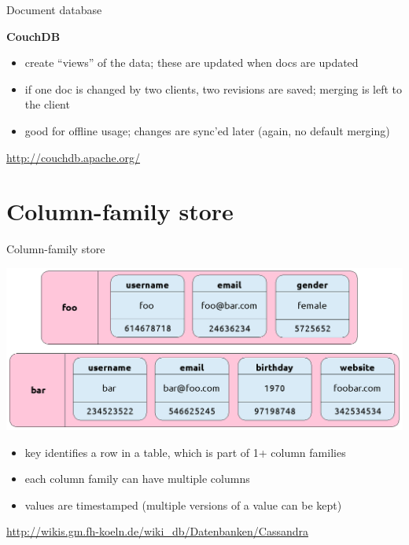 \documentclass{beamer}
\begin{document}
\begin{frame}{Document database}

  \textbf{CouchDB}

  \vskip 0.15in

  \begin{itemize}
  \item create ``views'' of the data; these are updated when docs are updated
  \item if one doc is changed by two clients, two revisions are saved;
    merging is left to the client
  \item good for offline usage; changes are sync'ed later (again, no
    default merging)
  \end{itemize}

  \vskip 0.15in

  \url{http://couchdb.apache.org/}


\end{frame}

\section{Column-family store}

\begin{frame}{Column-family store}

  \begin{center}
    \includegraphics[width=0.8\linewidth]{excf.png}
  \end{center}

  \begin{itemize}
  \item key identifies a row in a table, which is part of 1+ column families
  \item each column family can have multiple columns
  \item values are timestamped (multiple versions of a value can be kept)
  \end{itemize}

  {\footnotesize \url{http://wikis.gm.fh-koeln.de/wiki_db/Datenbanken/Cassandra}}

\end{frame}
\end{document}
